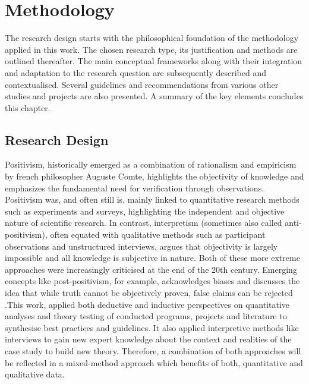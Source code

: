 
\chapter{Methodology} %

\label{chap3:methodology} %

The research design starts with the philosophical foundation of the methodology applied in this work. The chosen research type, its justification and methods are outlined thereafter. The main conceptual frameworks along with their integration and adaptation to the research question are subsequently described and contextualised. Several guidelines and recommendations from various other studies and projects are also presented. A summary of the key elements concludes this chapter.   

\section{Research Design} %

Positivism, historically emerged as a combination of rationalism and empiricism by french philosopher Auguste Comte, highlights the objectivity of knowledge and emphasizes the fundamental need for verification through observations. Positivism was, and often still is, mainly linked to quantitative research methods such as experiments and surveys, highlighting the independent and objective nature of scientific research. In contrast, interpretism (sometimes also called anti-positivism), often equated with qualitative methods such as participant observations and unstructured interviews, argues that objectivity is largely impossible and all knowledge is subjective in nature. Both of these more extreme approaches were increasingly criticised at the end of the 20th century. Emerging concepts like post-positivism, for example, acknowledges biases and discusses the idea that while truth cannot be objectively proven, false claims can be rejected \autocite{pelzResearchMethodsSocial,trochimResearchMethodsKnowledge2001}.\linebreak[1]
This work, applied both deductive and inductive perspectives on quantitative analyses and theory testing of conducted programs, projects and literature to synthesise best practices and guidelines. It also applied interpretive methods like interviews to gain new expert knowledge about the context and realities of the case study to build new theory. Therefore, a combination of both approaches will be reflected in a mixed-method approach which benefits of both, quantitative and qualitative data.

